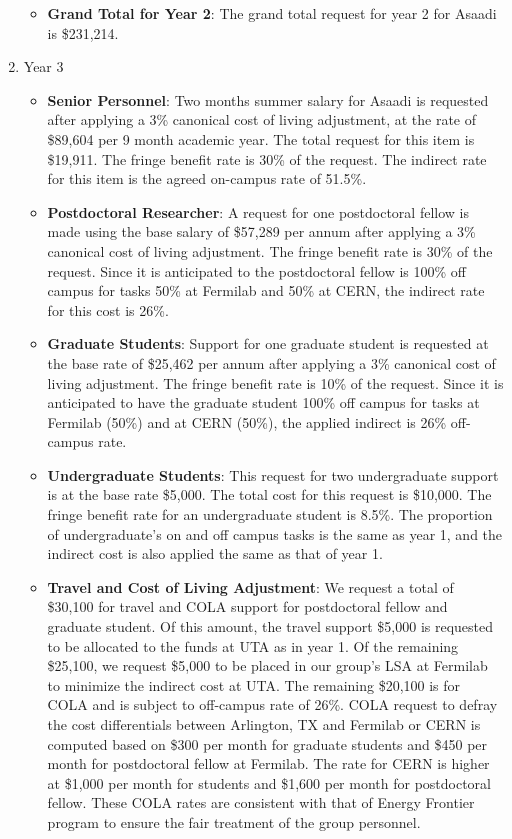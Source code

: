 \begin{enumerate}
\begin{itemize}[noitemsep,nolistsep]
\item {{\bf Grand Total for Year 2}: The grand total request for year 2 for Asaadi is \$231,214.}

\end{itemize}

\item{Year 3}
\begin{itemize}[noitemsep,nolistsep]
\item{{\bf Senior Personnel}: Two months summer salary for Asaadi is requested after applying a 3\% canonical cost of living adjustment, at the rate of \$89,604 per 9 month academic year.  The total request for this item is \$19,911.   The fringe benefit rate is 30\% of the request.  The indirect rate for this item is the agreed on-campus rate of 51.5\%.}

\item {{\bf Postdoctoral Researcher}: A request for one postdoctoral fellow is made using the base salary of \$57,289 per annum after applying a 3\% canonical cost of living adjustment.  The fringe benefit rate is 30\% of the request.  Since it is anticipated to the postdoctoral fellow is 100\% off campus for tasks 50\% at Fermilab and 50\% at CERN, the indirect rate for this cost is 26\%.} 

\item{{\bf Graduate Students}: Support for one graduate student is requested at the base rate of \$25,462 per annum after applying a 3\% canonical cost of living adjustment.   The fringe benefit rate is 10\% of the request.  Since it is anticipated to have the graduate student 100\% off campus for tasks at Fermilab (50\%) and at CERN (50\%), the applied indirect is 26\% off-campus rate.}

\item {{\bf Undergraduate Students}: This request for two undergraduate support is at the base rate \$5,000.  The total cost for this request is \$10,000.  The fringe benefit rate for an undergraduate student is 8.5\%.  The proportion of undergraduate’s on and off campus tasks is the same as year 1, and the indirect cost is also applied the same as that of year 1.}

\item{{\bf Travel and Cost of Living Adjustment}: We request a total of \$30,100 for travel and COLA support for postdoctoral fellow and graduate student.   Of this amount, the travel support \$5,000 is requested to be allocated to the funds at UTA as in year 1.  Of the remaining \$25,100, we request \$5,000 to be placed in our group’s LSA at Fermilab to minimize the indirect cost at UTA.   The remaining \$20,100 is for COLA and is subject to off-campus rate of 26\%.  COLA request to defray the cost differentials between Arlington, TX and Fermilab or CERN is computed based on \$300 per month for graduate students and \$450 per month for postdoctoral fellow at Fermilab.  The rate for CERN is higher at \$1,000 per month for students and \$1,600 per month for postdoctoral fellow.  These COLA rates are consistent with that of Energy Frontier program to ensure the fair treatment of the group personnel.  

}
\end{itemize}
\end{enumerate}
